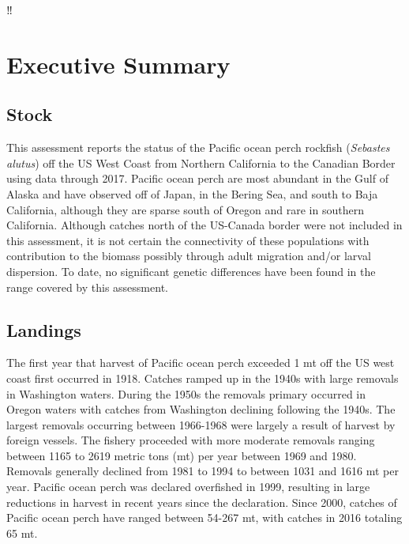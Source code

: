 \documentclass[12pt,]{article}
\begin{document}
{
\setcounter{tocdepth}{4}
\tableofcontents
}
\setlength{\parskip}{5mm plus1mm minus1mm} \pagebreak

\setcounter{page}{1} \renewcommand{\thefigure}{\alph{figure}}
‼\renewcommand{\thetable}{\alph{table}}

\section*{Executive Summary}\label{executive-summary}

\subsection*{Stock}\label{stock}

This assessment reports the status of the Pacific ocean perch rockfish
(\emph{Sebastes alutus}) off the US West Coast from Northern California
to the Canadian Border using data through 2017. Pacific ocean perch are
most abundant in the Gulf of Alaska and have observed off of Japan, in
the Bering Sea, and south to Baja California, although they are sparse
south of Oregon and rare in southern California. Although catches north
of the US-Canada border were not included in this assessment, it is not
certain the connectivity of these populations with contribution to the
biomass possibly through adult migration and/or larval dispersion. To
date, no significant genetic differences have been found in the range
covered by this assessment.

\subsection*{Landings}\label{landings}

The first year that harvest of Pacific ocean perch exceeded 1 mt off the
US west coast first occurred in 1918. Catches ramped up in the 1940s
with large removals in Washington waters. During the 1950s the removals
primary occurred in Oregon waters with catches from Washington declining
following the 1940s. The largest removals occurring between 1966-1968
were largely a result of harvest by foreign vessels. The fishery
proceeded with more moderate removals ranging between 1165 to 2619
metric tons (mt) per year between 1969 and 1980. Removals generally
declined from 1981 to 1994 to between 1031 and 1616 mt per year. Pacific
ocean perch was declared overfished in 1999, resulting in large
reductions in harvest in recent years since the declaration. Since 2000,
catches of Pacific ocean perch have ranged between 54-267 mt, with
catches in 2016 totaling 65 mt.
\end{document}
